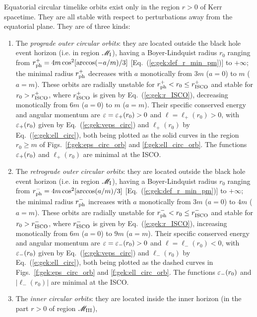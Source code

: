 \begin{greybox}
Equatorial circular timelike orbits exist only in the region $r>0$ of Kerr spacetime.
They are all stable with respect to perturbations away from the equatorial plane.
They are of three kinds:
\begin{enumerate}
\item The \emph{prograde outer circular orbits}: they are located outside
the black hole event horizon (i.e. in region $\mathscr{M}_{\rm I}$), having a Boyer-Lindquist radius $r_0$ ranging
from  $r_{\rm ph}^+ = 4 m \cos^2[\arccos(-a/m)/3]$
[Eq.~(\ref{e:gek:def_r_min_pm})] to $+\infty$;
the minimal radius
$r_{\rm ph}^+$ decreases with $a$ monotically from $3m$ ($a=0$) to $m$ ($a=m$).
These orbits are radially unstable for
$r_{\rm ph}^+ < r_0 \leq r_{\rm ISCO}^+$ and stable for $r_0 > r_{\rm ISCO}^+$,
where $r_{\rm ISCO}^+$ is given by Eq.~(\ref{e:gek:r_ISCO}),
decreasing monotically from $6m$ ($a=0$) to $m$ ($a=m$).
Their specific conserved energy and angular momentum
are $\varepsilon = \varepsilon_+(r_0) >  0$ and $\ell = \ell_+(r_0) > 0$, with
$\varepsilon_+(r_0)$ given by Eq.~(\ref{e:gek:veps_circ}) and $\ell_+(r_0)$ by
Eq.~(\ref{e:gek:ell_circ}), both being plotted as the solid
curves in the region $r_0 \geq m$ of Figs.~\ref{f:gek:eps_circ_orb} and \ref{f:gek:ell_circ_orb}.
The functions $\varepsilon_+(r_0)$ and $\ell_+(r_0)$ are minimal at the ISCO.
\item The \emph{retrograde outer circular orbits}: they are located outside
the black hole event horizon (i.e. in region $\mathscr{M}_{\rm I}$), having a Boyer-Lindquist radius $r_0$ ranging
from $r_{\rm ph}^- = 4 m \cos^2[\arccos(a/m)/3]$
[Eq.~(\ref{e:gek:def_r_min_pm})] to $+\infty$; the minimal radius
$r_{\rm ph}^-$ increases with $a$ monotically from $3m$ ($a=0$) to $4m$ ($a=m$).
These orbits are radially unstable for
$r_{\rm ph}^- < r_0 \leq r_{\rm ISCO}^-$ and stable for $r_0 > r_{\rm ISCO}^-$,
where $r_{\rm ISCO}^-$ is given by Eq.~(\ref{e:gek:r_ISCO}),
increasing monotically from $6m$ ($a=0$) to $9m$ ($a=m$).
Their specific conserved energy and angular momentum
are $\varepsilon = \varepsilon_-(r_0) > 0$ and $\ell = \ell_-(r_0) < 0$, with
$\varepsilon_-(r_0)$ given by Eq.~(\ref{e:gek:veps_circ}) and $\ell_-(r_0)$ by
Eq.~(\ref{e:gek:ell_circ}), both being plotted as the dashed
curves in Figs.~\ref{f:gek:eps_circ_orb} and \ref{f:gek:ell_circ_orb}.
The functions $\varepsilon_-(r_0)$ and $|\ell_-(r_0)|$ are minimal at the ISCO.
\item The \emph{inner circular orbits}: they are located inside the inner horizon
(in the part $r>0$ of region $\mathscr{M}_{\rm III}$),

\end{enumerate}
\end{greybox}
